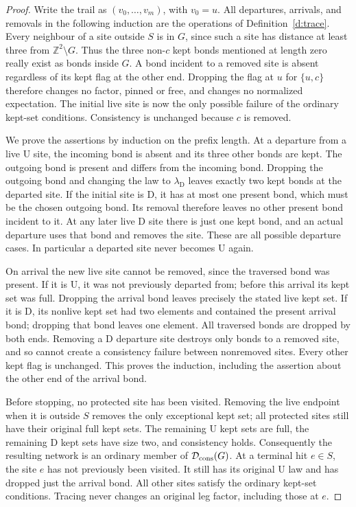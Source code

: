 \begin{proof}
Write the trail as \((v_0,\ldots,v_m)\), with \(v_0=u\).
All departures, arrivals, and removals in the following induction
are the operations of Definition~\ref{d:trace}.
Every neighbour of a site outside \(S\) is in \(G\), since such a
site has distance at least three from \(\mathbb Z^2\setminus G\).
Thus the three non-\(c\) kept bonds mentioned at length zero really
exist as bonds inside \(G\).  A bond incident to a removed site is
absent regardless of its kept flag at the other end.  Dropping the
flag at \(u\) for \(\{u,c\}\) therefore changes no factor, pinned
or free, and changes no normalized expectation.  The initial live
site is now the only possible failure of the ordinary kept-set
conditions.  Consistency is unchanged because \(c\) is removed.

We prove the assertions by induction on the prefix length.  At a
departure from a live \(\mathrm U\) site, the incoming bond is absent
and its three other bonds are kept.  The outgoing bond is present and
differs from the incoming bond.  Dropping the outgoing bond and
changing the law to \(\lambda_{\mathrm D}\) leaves exactly two kept
bonds at the departed site.  If the initial site is \(\mathrm D\),
it has at most one present bond, which must be the chosen outgoing
bond.  Its removal therefore leaves no other present bond incident
to it.  At any later live \(\mathrm D\) site there is just one kept
bond, and an actual departure uses that bond and removes the site.
These are all possible departure cases.  In particular a departed
site never becomes \(\mathrm U\) again.

On arrival the new live site cannot be removed, since the traversed
bond was present.  If it is \(\mathrm U\), it was not previously
departed from; before this arrival its kept set was full.  Dropping
the arrival bond leaves precisely the stated live kept set.  If it
is \(\mathrm D\), its nonlive kept set had two elements and contained
the present arrival bond; dropping that bond leaves one element.
All traversed bonds are dropped by both ends.  Removing a
\(\mathrm D\) departure site destroys only bonds to a removed site,
and so cannot create a consistency failure between nonremoved sites.
Every other kept flag is unchanged.  This proves the induction,
including the assertion about the other end of the arrival bond.

Before stopping, no protected site has been visited.  Removing the
live endpoint when it is outside \(S\) removes the only exceptional
kept set; all protected sites still have their original full kept
sets.  The remaining \(\mathrm U\) kept sets are full, the remaining
\(\mathrm D\) kept sets have size two, and consistency holds.
Consequently the resulting network is an ordinary member of
\(\mathcal D_{\rm cons}(G)\).  At a terminal hit \(e\in S\),
the site \(e\) has not previously been visited.  It still has its
original \(\mathrm U\) law and has dropped just the arrival bond.
All other sites satisfy the ordinary kept-set conditions.  Tracing
never changes an original leg factor, including those at \(e\).


\end{proof}
